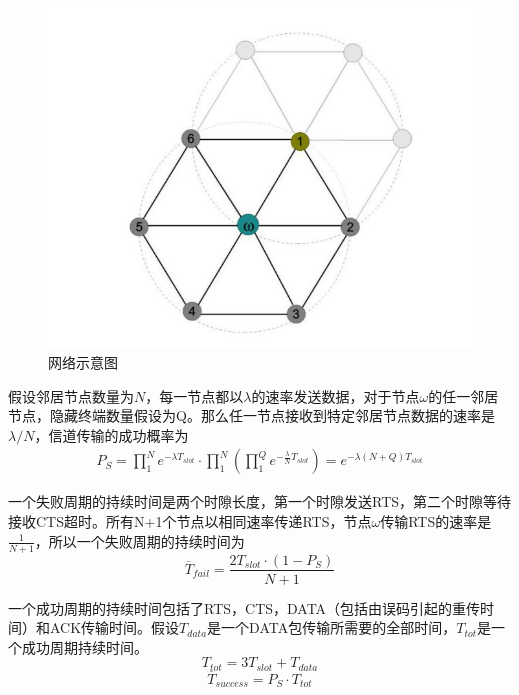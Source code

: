 \begin{figure}[!ht]
	\centering
	\includegraphics[scale=0.4]{figures/lay.png}
	\caption{
		网络示意图
	}
	\label{fig4}
\end{figure}

假设邻居节点数量为$N$，每一节点都以$\lambda$的速率发送数据，对于节点$\omega$的任一邻居节点，隐藏终端数量假设为Q。那么任一节点接收到特定邻居节点数据的速率是$\lambda/N$，信道传输的成功概率为
\begin{equation}
\begin{aligned}
P_S=\prod^N_1 e^{-\lambda T_{slot}}\cdot \prod^N_1 (\prod^Q_1 e^{-\frac{\lambda}{N} T_{slot}})= e^{-\lambda (N+Q) T_{slot}}
\end{aligned}
\end{equation}

一个失败周期的持续时间是两个时隙长度，第一个时隙发送RTS，第二个时隙等待接收CTS超时。所有N+1个节点以相同速率传递RTS，节点$\omega$传输RTS的速率是$\frac{1}{N+1}$，所以一个失败周期的持续时间为
\begin{equation}
\overline T_{fail}=\frac{{2T_{slot}}\cdot(1-P_S)}{N+1}
\end{equation}

一个成功周期的持续时间包括了RTS，CTS，DATA（包括由误码引起的重传时间）和ACK传输时间。假设$T_{data}$是一个DATA包传输所需要的全部时间，$T_{tot}$是一个成功周期持续时间。
\begin{equation}
T_{tot}=3T_{slot}+T_{data}
\end{equation}
\begin{equation}
\overline T_{success}=P_S \cdot T_{tot}
\end{equation}

